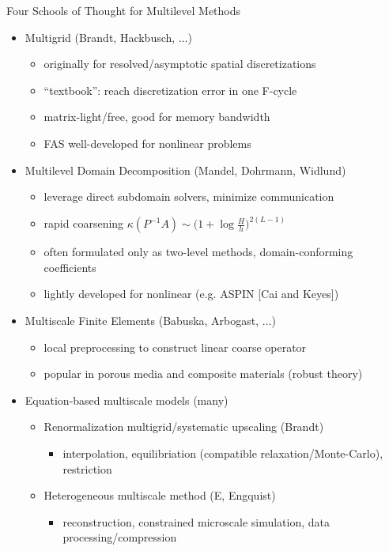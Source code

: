 \begin{frame}[shrink=5]{Four Schools of Thought for Multilevel Methods}
  \begin{itemize}
  \item Multigrid (Brandt, Hackbusch, $\dotsc$)
    \begin{itemize}
    \item originally for resolved/asymptotic spatial discretizations
    \item ``textbook'': reach discretization error in one F-cycle
    \item matrix-light/free, good for memory bandwidth
    \item FAS well-developed for nonlinear problems
    \end{itemize}
  \item Multilevel Domain Decomposition (Mandel, Dohrmann, Widlund)
    \begin{itemize}
    \item leverage direct subdomain solvers, minimize communication
    \item rapid coarsening $\kappa(P^{-1}A) \sim \big(1 + \log \frac H h \big)^{2(L-1)}$
    \item often formulated only as two-level methods, domain-conforming coefficients
    \item lightly developed for nonlinear (e.g. ASPIN [Cai and Keyes])
    \end{itemize}
  \item Multiscale Finite Elements (Babuska, Arbogast, $\dotsc$)
    \begin{itemize}
    \item local preprocessing to construct linear coarse operator
    \item popular in porous media and composite materials (robust theory)
    \end{itemize}
  \item Equation-based multiscale models (many)
    \begin{itemize}
    \item Renormalization multigrid/systematic upscaling (Brandt)
      \begin{itemize}
      \item interpolation, equilibriation (compatible relaxation/Monte-Carlo), restriction
      \end{itemize}
    \item Heterogeneous multiscale method (E, Engquist)
      \begin{itemize}
      \item reconstruction, constrained microscale simulation, data processing/compression
      \end{itemize}
    \end{itemize}
  \end{itemize}
\end{frame}

